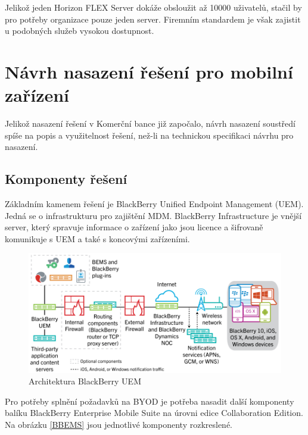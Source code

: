Jelikož jeden Horizon FLEX Server dokáže obsloužit až 10000 uživatelů, stačil by pro potřeby organizace pouze jeden server. Firemním standardem je však zajistit u podobných služeb vysokou dostupnost.




\section{Návrh nasazení řešení pro mobilní zařízení}
Jelikož nasazení řešení v Komerční bance již započalo, návrh nasazení soustředí spíše na popis a využitelnost řešení, než-li na technickou specifikaci návrhu pro nasazení.

\subsection{Komponenty řešení}


Základním kamenem řešení je BlackBerry Unified Endpoint Management (UEM).  Jedná se o infrastrukturu pro zajištění MDM. BlackBerry Infrastructure je vnější server, který spravuje informace o zařízení jako jsou licence a šifrovaně komunikuje s UEM a také s koncovými zařízeními.

\begin{figure}[h!]\label{BBUEM1}
\centering
\includegraphics[width=12cm]{img/BBUEM1}
\caption{Architektura BlackBerry UEM}
\end{figure} 

Pro potřeby splnění požadavků na BYOD je potřeba nasadit další komponenty balíku BlackBerry Enterprise Mobile Suite na úrovni edice Collaboration Edition. Na obrázku \ref{BBEMS} jsou jednotlivé komponenty rozkreslené.

